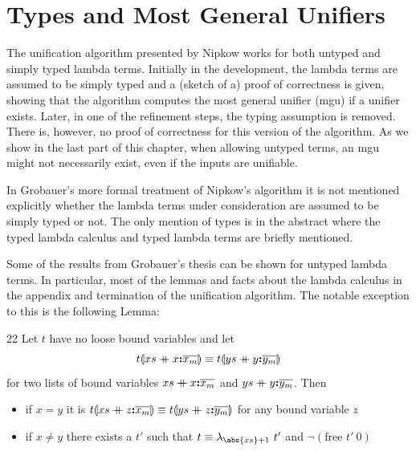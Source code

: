 \chapter{Types and Most General Unifiers}
\label{ch:types}

The unification algorithm presented by Nipkow \cite{Nipkow-LICS-93} works for both untyped and simply typed lambda terms. Initially in the development, the lambda terms are assumed to be simply typed and a (sketch of a) proof of correctness is given, showing that the algorithm computes the most general unifier (mgu) if a unifier exists. Later, in one of the refinement steps, the typing assumption is removed. There is, however, no proof of correctness for this version of the algorithm. As we show in the last part of this chapter, when allowing untyped terms, an mgu might not necessarily exist, even if the inputs are unifiable.

In Grobauer's more formal treatment of Nipkow's algorithm \cite{Grobauer} it is not mentioned explicitly whether the lambda terms under consideration are assumed to be simply typed or not. The only mention of types is in the abstract where the typed lambda calculus and typed lambda terms are briefly mentioned.

Some of the results from Grobauer's thesis can be shown for untyped lambda terms. In particular, most of the lemmas and facts about the lambda calculus in the appendix and termination of the unification algorithm. The notable exception to this is the following Lemma:

\begin{lemma}{22}
	\label{l22}
	Let $t$ have no loose bound variables and let
	\[
	t \llparenthesis xs \mathbin{+\mkern-10mu+} x \textbf{:} \overline{x_m} \rrparenthesis \equiv t  \llparenthesis ys \mathbin{+\mkern-10mu+} y \textbf{:} \overline{y_m} \rrparenthesis
	\]
	for two lists of bound variables $xs \mathbin{+\mkern-10mu+} x \textbf{:} \overline{x_m}$ and $ys \mathbin{+\mkern-10mu+} y \textbf{:} \overline{y_m}$. Then
	\begin{itemize}
		\item if $x = y$ it is $t \llparenthesis xs \mathbin{+\mkern-10mu+} z \textbf{:} \overline{x_m} \rrparenthesis \equiv t  \llparenthesis ys \mathbin{+\mkern-10mu+} z \textbf{:} \overline{y_m} \rrparenthesis$ for any bound variable $z$
		\item if $x \neq y$ there exists a $t'$ such that $t \equiv \abstrm{\abs{xs} + 1}{t'}$ and $\neg \left( \text{free } t' \ 0 \right)$
	\end{itemize}
\end{lemma}

